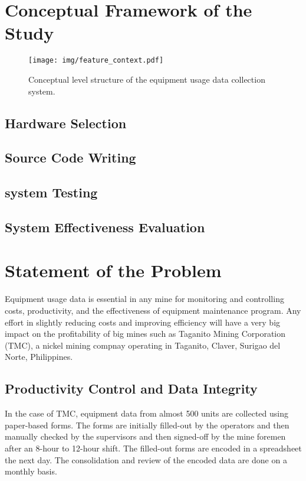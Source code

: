 \documentclass[12pt]{report}
\begin{document}
\section{Conceptual Framework of the Study}

\begin{figure}[H]
    \centering
    \texttt{[image: img/feature\_context.pdf]}
    \caption{Conceptual level structure of the equipment usage data collection system.}
    \label{fig:concept_structure}
\end{figure}

\subsection{Hardware Selection}

\subsection{Source Code Writing}

\subsection{system Testing}

\subsection{System Effectiveness Evaluation}

\section{Statement of the Problem}

Equipment usage data is essential in any mine for monitoring and controlling costs, productivity, and the effectiveness of equipment maintenance program.
Any effort in slightly reducing costs and improving efficiency will have a very big impact on the profitability of big mines such as Taganito Mining Corporation (TMC), a nickel mining compnay operating in Taganito, Claver, Surigao del Norte, Philippines.

\subsection{Productivity Control and Data Integrity}

In the case of TMC, equipment data from almost 500 units are collected using paper-based forms.
The forms are initially filled-out by the operators and then manually checked by the supervisors and then signed-off by the mine foremen after an 8-hour to 12-hour shift.
The filled-out forms are encoded in a spreadsheet the next day.
The consolidation and review of the encoded data are done on a monthly basis.
\end{document}
